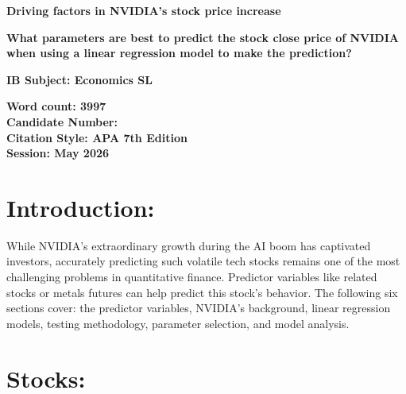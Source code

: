 \documentclass[12pt]{article}
\begin{document}
\begin{center}
\textbf{Driving factors in NVIDIA’s stock price increase}
\end{center}

\vspace{1em}

\begin{center}
\textbf{What parameters are best to predict the stock close price of NVIDIA when using a linear regression model to make the prediction?}
\end{center}

\vspace{1em}

\begin{center}
\textbf{IB Subject: Economics SL}

\vspace{1em}

\textbf{Word count: 3997} \\
\textbf{Candidate Number: } \\
\textbf{Citation Style: APA 7th Edition } \\
\textbf{Session: May 2026}
\end{center}

\vspace{2em}

\newpage

\section{Introduction:}

While NVIDIA's extraordinary growth during the AI boom has captivated investors, accurately predicting such volatile tech stocks remains one of the most challenging problems in quantitative finance. Predictor variables like related stocks or metals futures can help predict this stock's behavior. The following six sections cover: the predictor variables, NVIDIA's background, linear regression models, testing methodology, parameter selection, and model analysis. 

\section{Stocks:}
\end{document}
